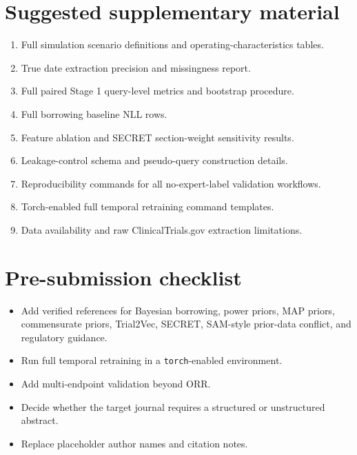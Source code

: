 \documentclass[11pt]{article}
\begin{document}
\section*{Suggested supplementary material}

\begin{enumerate}[leftmargin=*]
  \item Full simulation scenario definitions and operating-characteristics tables.
  \item True date extraction precision and missingness report.
  \item Full paired Stage 1 query-level metrics and bootstrap procedure.
  \item Full borrowing baseline NLL rows.
  \item Feature ablation and SECRET section-weight sensitivity results.
  \item Leakage-control schema and pseudo-query construction details.
  \item Reproducibility commands for all no-expert-label validation workflows.
  \item Torch-enabled full temporal retraining command templates.
  \item Data availability and raw ClinicalTrials.gov extraction limitations.
\end{enumerate}

\section*{Pre-submission checklist}

\begin{itemize}[leftmargin=*]
  \item Add verified references for Bayesian borrowing, power priors, MAP priors, commensurate priors, Trial2Vec, SECRET, SAM-style prior-data conflict, and regulatory guidance.
  \item Run full temporal retraining in a \texttt{torch}-enabled environment.
  \item Add multi-endpoint validation beyond ORR.
  \item Decide whether the target journal requires a structured or unstructured abstract.
  \item Replace placeholder author names and citation notes.
\end{itemize}
\end{document}
